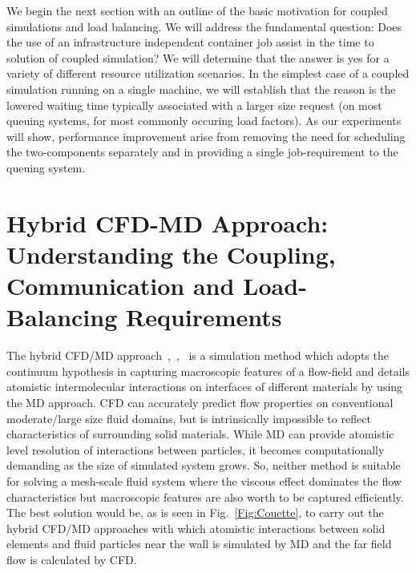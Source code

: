 \documentclass[conference,final]{IEEEtran}
\newcommand{\jhanote}[1]{ {\textcolor{red} { ***Jha: #1 }}}
\newcommand{\skonote}[1]{ {\textcolor{blue} { ***Jeff: #1 }}}
\newcommand{\jhanote}[1]{}
\newcommand{\skonote}[1]{}
\begin{document}
We begin the next section with an outline of the basic motivation for
coupled simulations and load balancing.  We will address the
fundamental question: Does the use of an infrastructure independent
container job assist in the time to solution of coupled simulation? We
will determine that the answer is yes for a variety of different
resource utilization scenarios. In the simplest case of a coupled
simulation running on a single machine, we will establish that the
reason is the lowered waiting time typically associated with a larger
size request (on most queuing systems, for most commonly occuring load
factors).  As our experiments will show, performance improvement arise
from removing the need for scheduling the two-components separately
and in providing a single job-requirement to the queuing system.


\section{Hybrid CFD-MD Approach: Understanding the Coupling,
  Communication and Load-Balancing Requirements}


The hybrid CFD/MD approach~\cite{Thompson},~\cite{Nie},~\cite{Yen} is
a simulation method which adopts the continuum hypothesis in capturing
macroscopic features of a flow-field and details atomistic
intermolecular interactions on interfaces of different materials by
using the MD approach. CFD can accurately predict flow properties on
conventional moderate/large size fluid domains, but is intrinsically
impossible to reflect characteristics of surrounding solid materials.
While MD can provide atomistic level resolution of interactions
between particles, it becomes computationally demanding as the size of simulated system grows. So, neither method is suitable for solving a mesh-scale fluid system where the viscous effect dominates the flow characteristics but macroscopic features are also worth to be captured efficiently. The best solution would be, as is seen in Fig.~\ref{Fig:Couette}, to
carry out the hybrid CFD/MD approaches with which atomistic
interactions between solid elements and fluid particles near the wall
is simulated by MD and the far field flow is calculated by CFD.


\end{document}
